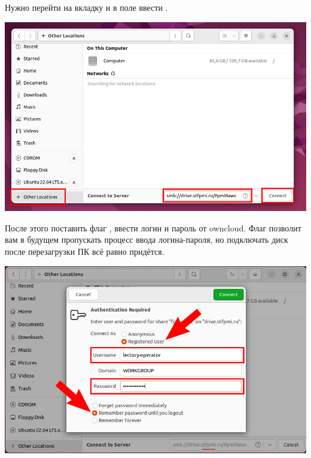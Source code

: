 Нужно перейти на вкладку  и в поле  ввести .

\begin{center}
  \begin{minipage}[c]{\textwidth - \fboxaddlen}
    \centering
    \includegraphics[width={\textwidth - \fboxaddlen},fbox]{Images/CloudStorage/ubuntu/nautilus/other-locations.jpg}
  \end{minipage}
\end{center}

После этого поставить флаг , ввести логин и пароль от owncloud. Флаг  позволит вам в будущем пропускать процесс ввода логина-пароля, но подключать диск после перезагрузки ПК всё равно придётся.

\begin{center}
  \begin{minipage}[c]{\textwidth - \fboxaddlen}
    \centering
    \includegraphics[width={\textwidth - \fboxaddlen},fbox]{Images/CloudStorage/ubuntu/nautilus/auth.jpg}
  \end{minipage}
\end{center}

